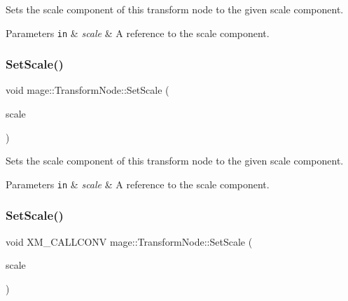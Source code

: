 Sets the scale component of this transform node to the given scale component.


\begin{DoxyParams}[1]{Parameters}
\mbox{\tt in}  & {\em scale} & A reference to the scale component. \\
\hline
\end{DoxyParams}
\hypertarget{structmage_1_1_transform_node_aaaa992bbd1ebad4b858fcb28ce2781d0}{}\label{structmage_1_1_transform_node_aaaa992bbd1ebad4b858fcb28ce2781d0} 
\subsubsection{\texorpdfstring{Set\+Scale()}{SetScale()}\hspace{0.1cm}{\footnotesize\ttfamily [4/5]}}
{\footnotesize\ttfamily void mage\+::\+Transform\+Node\+::\+Set\+Scale (\begin{DoxyParamCaption}\item[{X\+M\+F\+L\+O\+A\+T3 \&\&}]{scale }\end{DoxyParamCaption})\hspace{0.3cm}{\ttfamily [noexcept]}}

Sets the scale component of this transform node to the given scale component.


\begin{DoxyParams}[1]{Parameters}
\mbox{\tt in}  & {\em scale} & A reference to the scale component. \\
\hline
\end{DoxyParams}
\hypertarget{structmage_1_1_transform_node_ad90daae6725ce76c43429ef5ab90c2da}{}\label{structmage_1_1_transform_node_ad90daae6725ce76c43429ef5ab90c2da} 
\subsubsection{\texorpdfstring{Set\+Scale()}{SetScale()}\hspace{0.1cm}{\footnotesize\ttfamily [5/5]}}
{\footnotesize\ttfamily void X\+M\+\_\+\+C\+A\+L\+L\+C\+O\+NV mage\+::\+Transform\+Node\+::\+Set\+Scale (\begin{DoxyParamCaption}\item[{F\+X\+M\+V\+E\+C\+T\+OR}]{scale }\end{DoxyParamCaption})\hspace{0.3cm}{\ttfamily [noexcept]}}

